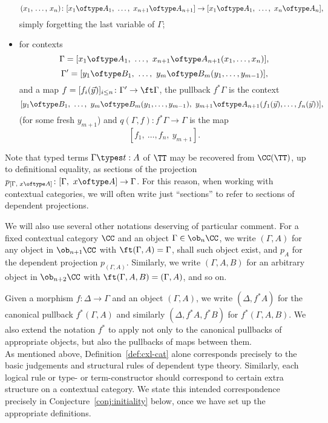 \begin{example}
\begin{itemize}
\[ (x_1,\, \ldots,\, x_n) \colon [ x_1 \oftype A_1,\ \ldots,\ x_{n+1} \oftype A_{n+1}] \to [ x_1 \oftype A_1,\ \ldots,\ x_n \oftype A_n ], \]
simply forgetting the last variable of $\Gamma$;
\item for contexts
\[\Gamma = [ x_1 \oftype A_1,\ \ldots,\ x_{n+1} \oftype A_{n+1}(x_1,\ldots,x_n)],\] 
\[\Gamma' = [ y_1 \oftype B_1,\ \ldots,\ y_{m} \oftype B_{m}(y_1,\ldots,y_{m-1})],\]
and a map $f = [f_i(\vec y)]_{i \leq n} \colon \Gamma' \to \ft \Gamma$, the pullback $f^* \Gamma$ is the context
\[  [ y_1 \oftype B_1,\ \ldots,\ y_{m} \oftype B_{m}(y_1,\ldots,y_{m-1}),\ y_{m+1} \oftype A_{n+1}(f_1(\vec y),\ldots,f_n(\vec y))], \]
(for some fresh $y_{m+1}$) and $q(\Gamma,f) \colon f^*\Gamma \to \Gamma$ is the map
\[ [ f_1,\ \ldots, f_n,\ y_{m+1} ]. \]
\end{itemize}
\end{example}

Note that typed terms $\Gamma \types t : A$ of $\TT$ may be recovered from $\CC(\TT)$, up to definitional equality, as sections of the projection $p_{[\Gamma,\;x \oftype A]} \colon [\Gamma,\ x \oftype A] \to \Gamma$.  For this reason, when working with contextual categories, we will often write just “sections” to refer to sections of dependent projections.

We will also use several other notations deserving of particular comment.  For a fixed contextual category $\CC$ and an object $\Gamma \in \ob_n \CC$, we write $(\Gamma,A)$ for any object in $\ob_{n+1} \CC$ with $\ft(\Gamma,A) = \Gamma$, shall such object exist, and $p_A$ for the dependent projection $p_{(\Gamma,A)}$. Similarly, we write $(\Gamma,A,B)$ for an arbitrary object in $\ob_{n+2} \CC$ with $\ft(\Gamma, A, B) = (\Gamma, A)$, and so on.  

Given a morphism $f \colon \Delta \to \Gamma$ and an object $(\Gamma, A)$, we write $(\Delta, f^*A)$ for the canonical pullback $f^*(\Gamma, A)$ and similarly $(\Delta, f^*A, f^*B)$ for $f^*(\Gamma, A, B)$. We also extend the notation $f^*$ to apply not only to the canonical pullbacks of appropriate objects, but also the pullbacks of maps between them. \\

As mentioned above, Definition~\ref{def:cxl-cat} alone corresponds precisely to the basic judgements and structural rules of dependent type theory.  Similarly, each logical rule or type- or term-constructor should correspond to certain extra structure on a contextual category.   We state this intended correspondence precisely in Conjecture~\ref{conj:initiality} below, once we have set up the appropriate definitions.

